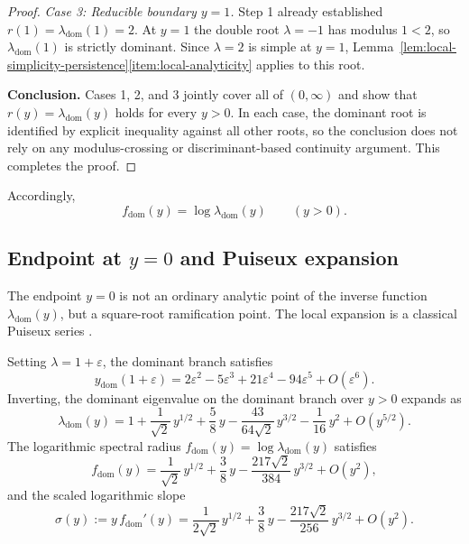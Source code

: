 \begin{proof}
\noindent\textit{Case 3: Reducible boundary $y=1$.}
Step 1 already established $r(1)=\lambda_{\mathrm{dom}}(1)=2$.
At $y=1$ the double root $\lambda=-1$ has modulus $1<2$, so $\lambda_{\mathrm{dom}}(1)$ is strictly dominant.
Since $\lambda=2$ is simple at $y=1$, Lemma~\ref{lem:local-simplicity-persistence}\ref{item:local-analyticity} applies to this root.

\medskip
\noindent\textbf{Conclusion.}
Cases 1, 2, and 3 jointly cover all of $(0,\infty)$ and show that $r(y)=\lambda_{\mathrm{dom}}(y)$ holds for every $y>0$.
In each case, the dominant root is identified by explicit inequality against all other roots, so the conclusion does not rely on any modulus-crossing or discriminant-based continuity argument.
This completes the proof.
\end{proof}

Accordingly,
\[
f_{\mathrm{dom}}(y)=\log \lambda_{\mathrm{dom}}(y)
\qquad (y>0).
\]

\subsection{Endpoint at \texorpdfstring{\(y=0\)}{y=0} and Puiseux expansion}\label{subsec:vacuum-puiseux}

The endpoint $y = 0$ is not an ordinary analytic point of the inverse function $\lambda_{\mathrm{dom}}(y)$, but a square-root ramification point.
The local expansion is a classical Puiseux series \cite{BrieskornKnorrer1986,Walker1950}.

\begin{proposition}[Endpoint Puiseux expansion at \(y=0\)]\label{prop:vacuum-puiseux}
Setting $\lambda = 1 + \varepsilon$, the dominant branch satisfies
\begin{equation}\label{eq:y-puiseux}
y_{\mathrm{dom}}(1 + \varepsilon)
= 2\varepsilon^2 - 5\varepsilon^3 + 21\varepsilon^4 - 94\varepsilon^5 + O(\varepsilon^6).
\end{equation}
Inverting, the dominant eigenvalue on the dominant branch over \(y>0\) expands as
\begin{equation}\label{eq:lambda-puiseux}
\lambda_{\mathrm{dom}}(y)
= 1 + \frac{1}{\sqrt{2}}\,y^{1/2}
+ \frac{5}{8}\,y
- \frac{43}{64\sqrt{2}}\,y^{3/2}
- \frac{1}{16}\,y^2
+ O(y^{5/2}).
\end{equation}
The logarithmic spectral radius
$f_{\mathrm{dom}}(y) = \log\lambda_{\mathrm{dom}}(y)$
satisfies
\begin{equation}\label{eq:f-puiseux}
f_{\mathrm{dom}}(y)
= \frac{1}{\sqrt{2}}\,y^{1/2}
+ \frac{3}{8}\,y
- \frac{217\sqrt{2}}{384}\,y^{3/2}
+ O(y^2),
\end{equation}
and the scaled logarithmic slope
\begin{equation}\label{eq:rho-vacuum}
\sigma(y):=y\,f_{\mathrm{dom}}'(y)
= \frac{1}{2\sqrt{2}}\,y^{1/2}
+ \frac{3}{8}\,y
- \frac{217\sqrt{2}}{256}\,y^{3/2}
+ O(y^2).
\end{equation}
\end{proposition}

